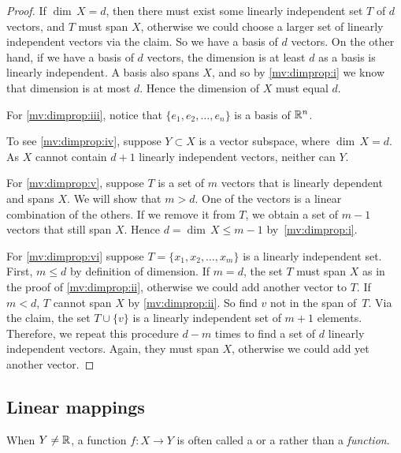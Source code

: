 \begin{proof}
If $\dim \, X = d$,
then there must exist some linearly independent set $T$ of $d$ vectors,
and $T$ must span $X$, otherwise we could choose a larger set of linearly
independent vectors via the claim.  So we have a basis of $d$ vectors.
On the other hand, if we have a basis of $d$ vectors,
the dimension is at least $d$ as a basis is linearly independent.
A basis also spans $X$, and so
by \ref{mv:dimprop:i} we know that dimension is at most $d$.
Hence the dimension of $X$ must equal $d$.

For \ref{mv:dimprop:iii}, notice that $\{ e_1, e_2, \ldots, e_n \}$ is a basis of ${\mathbb{R}}^n$.

To see \ref{mv:dimprop:iv},
suppose $Y \subset X$ is a vector subspace,
where $\dim \, X = d$.  As $X$ cannot contain $d+1$ linearly independent
vectors, neither can $Y$.

For \ref{mv:dimprop:v}, suppose $T$ is a set of $m$ vectors
that is linearly dependent
and spans $X$.
We will show that $m > d$.
One of the
vectors is a linear combination of the others.  If we remove it
from $T$, we obtain a set of $m-1$ vectors that still span $X$.
Hence
$d = \dim \, X \leq m-1$ by~\ref{mv:dimprop:i}.

For \ref{mv:dimprop:vi} suppose $T = \{ x_1, x_2, \ldots, x_m \}$ is
a linearly independent set.  First, $m \leq d$ by definition of dimension.
If $m=d$, the set $T$ must span $X$ as in the proof of \ref{mv:dimprop:ii},
otherwise we could add another vector to $T$.
If $m < d$,  $T$ cannot span $X$ by \ref{mv:dimprop:ii}.
So find $v$ not in the span of~$T$.
Via the claim, the set $T \cup \{ v \}$ is
a linearly independent set of $m+1$ elements.
Therefore, we repeat this procedure $d-m$ times to
find a set of $d$ linearly independent vectors.
Again, they must span $X$, otherwise we could add yet another vector.
\end{proof}

\subsection{Linear mappings}

When $Y \not= {\mathbb{R}}$,
a function $f \colon X \to Y$ is often called a
\emph{} or a \emph{}
rather than a \emph{function}.

